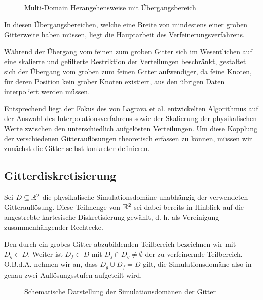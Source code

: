\begin{figure}[h]
\centering

\caption{Multi-Domain Herangehensweise mit Übergangsbereich \cite[vgl.~Abb.~3]{Lagrava12}}
\label{fig:MultiDomainOverlap}
\end{figure}

\noindent
In diesen Übergangsbereichen, welche eine Breite von mindestens einer groben Gitterweite haben müssen, liegt die Hauptarbeit des Verfeinerungsverfahrens.

\bigskip
Während der Übergang vom feinen zum groben Gitter sich im Wesentlichen auf eine skalierte und gefilterte Restriktion der Verteilungen beschränkt, gestaltet sich der Übergang vom groben zum feinen Gitter aufwendiger, da feine Knoten, für deren Position kein grober Knoten existiert, aus den übrigen Daten interpoliert werden müssen.

Entsprechend liegt der Fokus des von Lagrava et al. entwickelten Algorithmus auf der Auswahl des Interpolationsverfahrens sowie der Skalierung der physikalischen Werte zwischen den unterschiedlich aufgelösten Verteilungen. Um diese Kopplung der verschiedenen Gitterauflösungen theoretisch erfassen zu können, müssen wir zunächst die Gitter selbst konkreter definieren.

\newpage
\subsection{Gitterdiskretisierung}

\begin{Definition}
\label{def:SimDomain}
Sei \(D \subseteq \mathbb{R}^2\) die physikalische Simulationsdomäne unabhängig der verwendeten Gitterauflösung. Diese Teilmenge von \(\mathbb{R}^2\) sei dabei bereits in Hinblick auf die angestrebte kartesische Diskretisierung gewählt, d. h. als Vereinigung zusammenhängender Rechtecke.

Den durch ein grobes Gitter abzubildenden Teilbereich bezeichnen wir mit \(D_g \subset D\). Weiter ist \(D_f \subset D\) mit \(D_f \cap D_g \neq \emptyset\) der zu verfeinernde Teilbereich. O.B.d.A. nehmen wir an, dass \(D_g \cup D_f = D\) gilt, die Simulationsdomäne also in genau zwei Auflösungsstufen aufgeteilt wird.
\end{Definition}

\begin{figure}[h]
\centering

\caption{Schematische Darstellung der Simulationsdomänen der Gitter}
\label{fig:SimDomain}
\end{figure}

